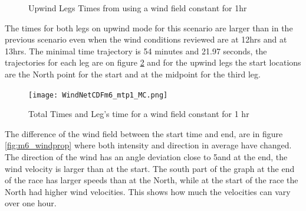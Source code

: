 \begin{figure} [hbt!]
  \centering
  \hfill
  \caption{Upwind Legs Times from using a wind field constant for 1hr} %
\label{fig:Windm6_upwind}
\end{figure}

The times for both legs on upwind mode for this scenario are larger than in the previous scenario even when the wind conditions reviewed are at 12hrs and at 13hrs. The minimal time trajectory is 54 minutes and 21.97 seconds, the trajectories for each leg are on figure \ref{fig:times_windm6} and for the upwind legs the start locations are the North point for the start and at the midpoint for the third leg. \par 

\begin{figure} [hbt!]
    \centering
    \texttt{[image: WindNetCDFm6\_mtp1\_MC.png]}
    \caption{Total Times and Leg's time for a wind field constant for 1 hr}
    \label{fig:times_windm6}
\end{figure}

The difference of the wind field between the start time and end, are in figure \ref{fig:m6_windprop} where both intensity and direction in average have changed. The direction of the wind has an angle deviation close to 5\degree and at the end, the wind velocity is larger than at the start. The south part of the graph at the end of the race has larger speeds than at the North, while at the start of the race the North had higher wind velocities. This shows how much the velocities can vary over one hour. \par 


